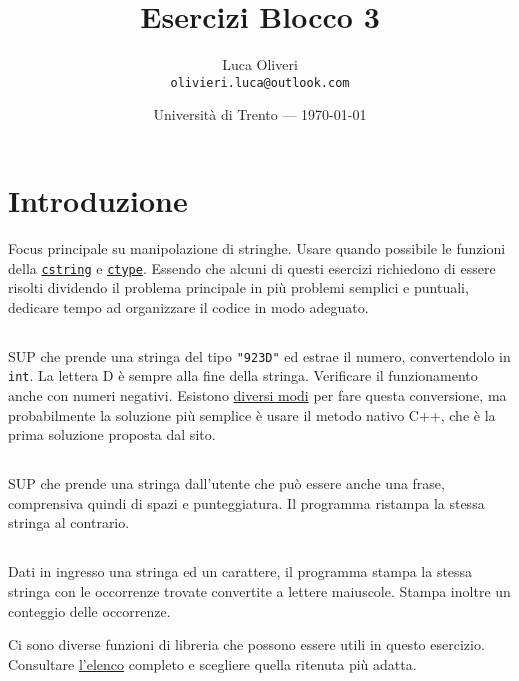 \documentclass{article}
\title{Esercizi Blocco 3} %
\author{Luca Oliveri\\ \texttt{olivieri.luca@outlook.com}} %
\date{Università di Trento --- \today} %
\begin{document}
\maketitle %

\section*{Introduzione} %

\setcounter{section}{3}
Focus principale su manipolazione di stringhe. Usare quando possibile le funzioni della \href{http://www.cplusplus.com/reference/cstring/}{\texttt{cstring}} e \href{http://www.cplusplus.com/reference/cctype/}{\texttt{ctype}}. Essendo che alcuni di questi esercizi richiedono di essere risolti dividendo il problema principale in più problemi semplici e puntuali, dedicare tempo ad organizzare il codice in modo adeguato.


\subsection{}
SUP che prende una stringa del tipo \texttt{"923D"} ed estrae il numero, convertendolo in \texttt{int}. La lettera D è sempre alla fine della stringa. Verificare il funzionamento anche con numeri negativi. Esistono \href{https://www.geeksforgeeks.org/converting-strings-numbers-cc/}{diversi modi} per fare questa conversione, ma probabilmente la soluzione più semplice è usare il metodo nativo C++, che è la prima soluzione proposta dal sito.

\subsection{}
SUP che prende una stringa dall'utente che può essere anche una frase, comprensiva quindi di spazi e punteggiatura. Il programma ristampa la stessa stringa al contrario.  

\subsection{}
Dati in ingresso una stringa ed un carattere, il programma stampa la stessa stringa con le occorrenze trovate convertite a lettere maiuscole. Stampa inoltre un conteggio delle occorrenze.

\begin{info}
	Ci sono diverse funzioni di libreria che possono essere utili in questo esercizio. Consultare \href{http://www.cplusplus.com/reference/string/string/}{l'elenco} completo e scegliere quella ritenuta più adatta.
\end{info}
\end{document}
